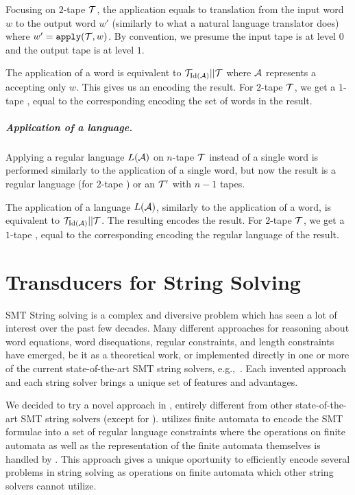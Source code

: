 Focusing on $2$-tape \nfts $\mathcal{T}$, the application equals to translation from the input word $w$ to the output word $w'$ (similarly to what a natural language translator does) where $w' = \texttt{apply}(\mathcal{T}, w)$.
By convention, we presume the input tape is at level $0$ and the output tape is at level $1$.

The application of a word is equivalent to $\mathcal{T}_{\text{Id}(\mathcal{A})} || \mathcal{T}$ where $\mathcal{A}$ represents a \dfa accepting only $w$.
This gives us an \nft encoding the result.
For $2$-tape $\mathcal{T}$, we get a $1$-tape \nft, equal to the corresponding \nfa encoding the set of words in the result.

\paragraph{Application of a language.}
Applying a regular language $L(\mathcal{A})$ on $n$-tape \nft $\mathcal{T}$ instead of a single word is performed similarly to the application of a single word, but now the result is a regular language (for $2$-tape \nfts) or an \nft $\mathcal{T}'$ with $n-1$ tapes.

The application of a language $L(\mathcal{A})$, similarly to the application of a word, is equivalent to $\mathcal{T}_{\text{Id}(\mathcal{A})} || \mathcal{T}$.
The resulting \nft encodes the result.
For $2$-tape $\mathcal{T}$, we get a $1$-tape \nft, equal to the corresponding \nfa encoding the regular language of the result.



\chapter{Transducers for String Solving}

SMT String solving is a complex and diversive problem which has seen a lot of interest over the past few decades.
Many different approaches for reasoning about word equations, word disequations, regular constraints, and length constraints have emerged, be it as a theoretical work, or implemented directly in one or more of the current state-of-the-art SMT string solvers, e.g.,~\cite{cvc4,cvc5,z3,Z3-str,Z3Str3,Z3str4,Trau,fm23_equations_synergy_regular_constraints_DBLP:conf/fm/BlahoudekCCHHLS23, tacas24_noodler_10.1007/978-3-031-57246-3_2, oopsla23_stabilization_DBLP:journals/pacmpl/ChenCHHLS23}.
Each invented approach and each string solver brings a unique set of features and advantages.

We decided to try a novel approach in \noodler, entirely different from other state-of-the-art SMT string solvers (except for \ostrich).
\noodler utilizes finite automata to encode the SMT formulae into a set of regular language constraints where the operations on finite automata as well as the representation of the finite automata themselves is handled by \mata.
This approach gives \noodler a unique oportunity to efficiently encode several problems in string solving as operations on finite automata which other string solvers cannot utilize.

